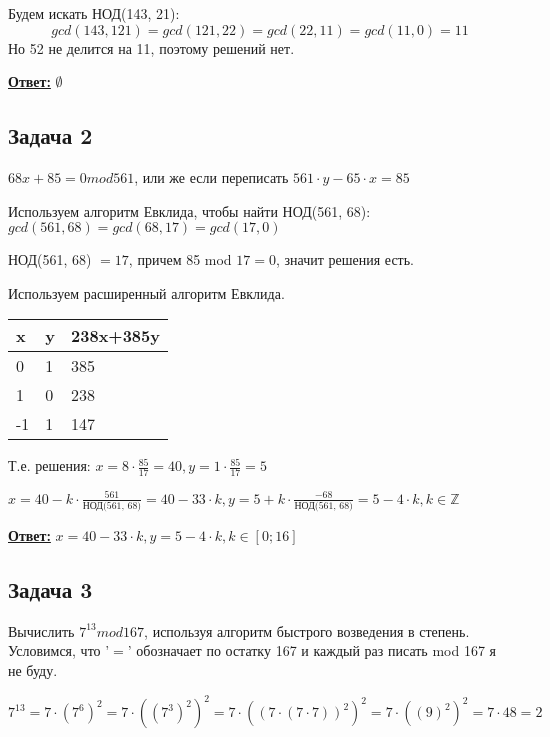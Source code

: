 \documentclass[a4paper,14pt]{article} %
\begin{document}
Будем искать НОД(143, 21): 
\begin{equation*}
gcd(143, 121) = gcd(121, 22) = gcd(22, 11) = gcd(11, 0) = 11
\end{equation*}
Но 52 не делится на 11, поэтому решений нет.


\underline{\textbf{Ответ:}} $\emptyset$


\subsection{Задача 2}
$68x + 85 = 0 mod 561$, или же если переписать $561 \cdot y - 65 \cdot x = 85$

Используем алгоритм Евклида, чтобы найти НОД(561, 68): $gcd(561, 68) = gcd(68, 17) = gcd(17, 0)$

НОД(561, 68) $= 17$,  причем 85 mod $17 = 0$, значит решения есть.

Используем расширенный алгоритм Евклида.

\begin{table}[H]
	\begin{tabular}{|l|l|l|}
	\hline
	x  & y & 238x+385y \\ \hline
	0  & 1 & 385       \\ \hline
	1  & 0 & 238       \\ \hline
	-1 & 1 & 147       \\ \hline
	\end{tabular}
\end{table}

Т.е. решения: $x = 8 \cdot \frac{85}{17} = 40, y = 1 \cdot \frac{85}{17} = 5$


$x = 40 - k \cdot \frac{561}{\text{НОД(561, 68)}} = 40 - 33 \cdot k, y = 5 + k \cdot \frac{-68}{\text{НОД(561, 68)}} = 5 - 4 \cdot k, k \in \mathds{Z}$

\underline{\textbf{Ответ:}} $x = 40 - 33 \cdot k, y = 5 - 4 \cdot k, k \in [0; 16]$

\subsection{Задача 3}
Вычислить $7^{13} mod 167$, используя алгоритм быстрого возведения в степень.
Условимся, что '$=$' обозначает по остатку 167 и каждый раз писать mod 167 я не буду.

\begin{equation*}
	7^{13} = 7 \cdot (7^6)^2 = 7 \cdot ((7^3)^2)^2 = 7 \cdot ((7 \cdot (7 \cdot 7))^2)^2 = 7 \cdot ((9)^2)^2 = 7 \cdot 48 = 2	
\end{equation*}
\end{document}
